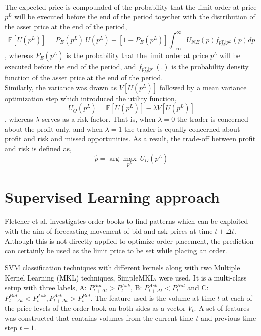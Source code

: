 \hfill
\\
The expected price is compounded of the probability that the limit order at price $p^L$ will be executed before the end of the period together with the distribution of the asset price at the end of the period,
\begin{equation}
    \mathbb{E}[U(p^L)] = P_E(p^L)\ U(p^L) + [1-P_E(p^L)] \int_{-\infty}^{\infty} U_{NE}(p) f_{p_M^T | p^L}(p) dp
\end{equation}
, whereas $P_E(p^L)$ is the probability that the limit order at price $p^L$ will be executed before the end of the period, and $f_{p_M^T | p^L}(.)$ is the probability density function of the asset price at the end of the period. 
\\
Similarly, the variance was drawn as $V[U(p^L)]$ followed by a mean variance optimization step which introduced the utility function,
\begin{equation}
    U_O(p^L) = \mathbb{E}[U(p^L)] - \lambda V[U(p^L)]
\end{equation}
, whereas $\lambda$ serves as a risk factor.
That is, when $\lambda=0$ the trader is concerned about the profit only, and when $\lambda=1$ the trader is equally concerned about profit and risk and missed opportunities.
As a result, the trade-off between profit and risk is defined as,
\begin{equation}
    \hat{p} = \arg\max_{p^L}\ U_O(p^L)
\end{equation}


\section{Supervised Learning approach}

Fletcher et al. \cite{fletcher2010multiple} investigates order books to find patterns which can be exploited with the aim of forecasting movement of bid and ask prices at time $t+\Delta{t}$.
Although this is not directly applied to optimize order placement, the prediction can certainly be used as the limit price to be set while placing an order.

SVM classification techniques with different kernels along with two Multiple Kernel Learning (MKL) techniques, SimpleMKL, were used.
It is a multi-class setup with three labels, A: $P_{t+\Delta{t}}^{Bid} > P_t^{Ask}$, B: $P_{t+\Delta{t}}^{Ask} < P_t^{Bid}$ and C: $P_{t+\Delta{t}}^{Bid} < P_t^{Ask}, P_{t+\Delta{t}}^{Ask} > P_t^{Bid}$.
The feature used is the volume at time $t$ at each of the price levels of the order book on both sides as a vector $V_t$.
A set of features was constructed that contains volumes from the current time $t$ and previous time step $t-1$.

